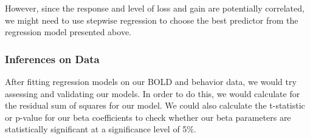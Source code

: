 However, since the response and level of loss and gain are potentially 
correlated, we might need to use stepwise regression to choose the best 
predictor from the regression model presented above.

\subsubsection{Inferences on Data}
\indent \indent After fitting regression models on our BOLD and behavior data, 
we would try assessing and validating our models. In order to do this, we would 
calculate for the residual sum of squares for our model. We could also 
calculate the t-statistic or p-value for our beta coefficients to check whether 
our beta parameters are statistically significant at a significance level of 
5\%.
